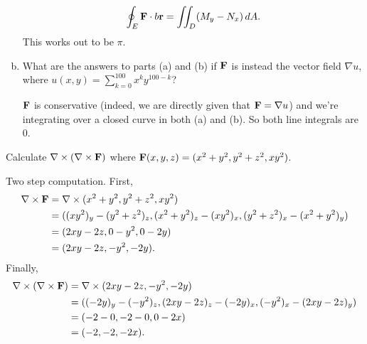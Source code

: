 \begin{problem}
\begin{enumerate}[(a)]
\begin{solution}
      \[\oint_E\mathbf F\cdot b\mathbf r = \iint_D(M_y-N_x)\,dA.\]
      This works out to be $\pi$.
    \end{solution}
    \item What are the answers to parts (a) and (b) if $\mathbf F$ is instead the vector field $\nabla u$, where $u(x,y)=\sum_{k=0}^{100}x^k y^{100-k}$?
    \begin{solution}
      $\mathbf F$ is conservative (indeed, we are directly given that $\mathbf F=\nabla u$) and we're integrating over a closed curve in both (a) and (b). So both line integrals are 0.
    \end{solution}
  \end{enumerate}
\end{problem}

\begin{problem}
  Calculate $\nabla\times(\nabla\times \mathbf F)$ where $\mathbf F(x,y,z)=(x^2+y^2,y^2+z^2,xy^2)$.
\end{problem}
\begin{solution}
  Two step computation. First,
  \[\begin{split}
    \nabla\times\mathbf F &= \nabla\times(x^2+y^2,y^2+z^2,xy^2)\\
    &= ((xy^2)_y-(y^2+z^2)_z,(x^2+y^2)_z-(xy^2)_x,(y^2+z^2)_x-(x^2+y^2)_y)\\
    &= (2xy-2z,0-y^2,0-2y)\\
    &= (2xy-2z,-y^2,-2y).
  \end{split}\]
  Finally,
  \[\begin{split}
    \nabla\times(\nabla\times\mathbf F) &= \nabla\times (2xy-2z,-y^2,-2y)\\
    &= ((-2y)_y-(-y^2)_z,(2xy-2z)_z-(-2y)_x,(-y^2)_x-(2xy-2z)_y)\\
    &= (-2-0,-2-0,0-2x)\\
    &= (-2,-2,-2x).
  \end{split}\]
\end{solution}


